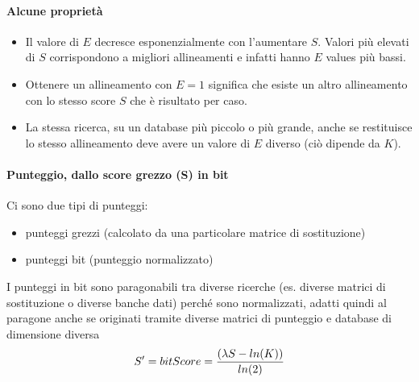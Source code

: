 \documentclass{article}
\begin{document}
\paragraph{Alcune proprietà}
\begin{itemize}
    \item Il valore di $E$ decresce esponenzialmente con l'aumentare $S$.
    Valori più elevati di $S$ corrispondono a migliori allineamenti e
    infatti hanno $E$ values più bassi.
    \item Ottenere un allineamento con $E = 1$ significa che esiste un
    altro allineamento con lo stesso score $S$ che è risultato per
    caso.
    \item La stessa ricerca, su un database più piccolo o più grande,
    anche se restituisce lo stesso allineamento deve avere un
    valore di $E$ diverso (ciò dipende da $K$).
\end{itemize}
\paragraph{Punteggio, dallo score grezzo (S) in bit}
Ci sono due tipi di punteggi:
\begin{itemize}
    \item punteggi grezzi (calcolato da una particolare matrice di
    sostituzione)
    \item punteggi bit (punteggio normalizzato)
\end{itemize}
I punteggi in bit sono paragonabili tra diverse ricerche
(es. diverse matrici di sostituzione o diverse banche dati)
perché sono normalizzati, adatti quindi al paragone anche se
originati tramite diverse matrici di punteggio e database di
dimensione diversa
$$ S' = bitScore = {(\lambda S - ln(K))\over ln(2)} $$
\end{document}
